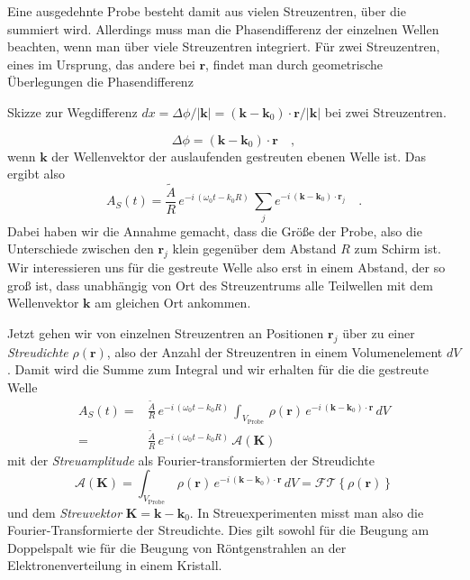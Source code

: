 Eine ausgedehnte Probe besteht damit aus vielen Streuzentren, über die summiert wird. Allerdings muss man die Phasendifferenz der einzelnen Wellen beachten, wenn man über viele Streuzentren integriert. Für zwei Streuzentren, eines im Ursprung, das andere bei $\mathbf{r}$, findet man durch geometrische Überlegungen die Phasendifferenz
%
\begin{marginfigure}
\caption{Skizze zur  Wegdifferenz $dx =  \Delta \phi / | \mathbf{k}|=  ( \mathbf{k} - \mathbf{k}_0 ) \cdot \mathbf{r} / |\mathbf{k}| $ bei zwei Streuzentren.}
\end{marginfigure}
%
\begin{equation}
\Delta \phi = ( \mathbf{k} - \mathbf{k}_0 ) \cdot \mathbf{r} \quad ,
\end{equation}
wenn $\mathbf{k}$ der Wellenvektor der auslaufenden gestreuten ebenen Welle ist. Das ergibt also
\begin{equation}
  A_S(t) =  \frac{\tilde{A}}{R} \,   e^{- i \, (\omega_0 t - k_0 R)} \,
  \sum_j  e^{- i \,  ( \mathbf{k} - \mathbf{k}_0 ) \cdot \mathbf{r}_j} \quad .
\end{equation}
Dabei haben wir die Annahme gemacht, dass die Größe der Probe, also die Unterschiede zwischen den $\mathbf{r}_j$ klein gegenüber dem Abstand $R$ zum Schirm ist. Wir interessieren uns für die gestreute Welle also erst in einem Abstand, der so groß ist, dass unabhängig von Ort des Streuzentrums alle Teilwellen mit dem Wellenvektor $\mathbf{k}$ am gleichen Ort ankommen. 

Jetzt gehen wir von einzelnen Streuzentren an Positionen $\mathbf{r}_j$  über zu einer \emph{Streudichte} $\rho(\mathbf{r})$, also der Anzahl der Streuzentren in einem Volumenelement $dV$. Damit wird die Summe zum Integral und wir erhalten für die die gestreute Welle
\begin{align}
 A_S(t) = & \frac{\tilde{A}}{R} \,   e^{- i \, (\omega_0 t - k_0 R)} \,
  \int_{V_\text{Probe}} \, \rho( \mathbf{r}) \,   e^{- i \,  ( \mathbf{k} - \mathbf{k}_0 ) \cdot \mathbf{r}} \, dV \\
  = & \frac{\tilde{A}}{R} \,   e^{- i \, (\omega_0 t - k_0 R)} \, \mathcal{A}(\mathbf{K}) 
\end{align}
mit der \emph{Streuamplitude} als Fourier-transformierten der Streudichte
\begin{equation}
\mathcal{A}(\mathbf{K}) =  \int_{V_\text{Probe}} \, \rho( \mathbf{r}) \,   e^{- i \,  ( \mathbf{k} - \mathbf{k}_0 ) \cdot \mathbf{r}} \, dV  = \mathcal{FT} \left\{ \rho( \mathbf{r})  \right\} \label{eq:rezi_streuamplitude}
\end{equation}
und dem \emph{Streuvektor} $\mathbf{K} = \mathbf{k} - \mathbf{k}_0$. In Streuexperimenten misst man also die Fourier-Transformierte der Streudichte. Dies gilt sowohl für die Beugung am Doppelspalt wie für die Beugung von Röntgenstrahlen an der Elektronenverteilung in einem Kristall. 

